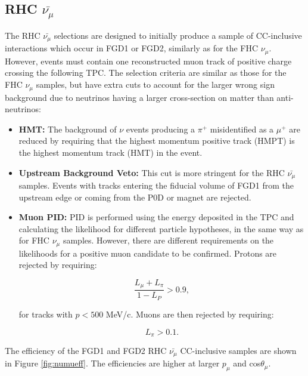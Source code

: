 \subsection{RHC $\bar{\nu_{\mu}}$}

The RHC $\bar{\nu_{\mu}}$ selections are designed to initially produce a sample of CC-inclusive interactions which occur in FGD1 or FGD2, similarly as for the FHC $\nu_{\mu}$. However, events must contain one reconstructed muon track of positive charge crossing the following TPC. The selection criteria are similar as those for the FHC $\nu_{\mu}$ samples, but have extra cuts to account for the larger wrong sign background due to neutrinos having a larger cross-section on matter than anti-neutrinos:

\begin{itemize}

\item \textbf{HMT:} The background of $\nu$ events producing a $\pi^+$ misidentified as a $\mu^+$ are reduced by requiring that the highest momentum positive track (HMPT) is the highest momentum track (HMT) in the event.

\item \textbf{Upstream Background Veto:} This cut is more stringent for the RHC $\bar{\nu_{\mu}}$ samples. Events with tracks entering the fiducial volume of FGD1 from the upstream edge or coming from the P0D or magnet are rejected.

\item \textbf{Muon PID:} PID is performed using the energy deposited in the TPC and calculating the likelihood for different particle hypotheses, in the same way as for FHC $\nu_{\mu}$ samples. However, there are different requirements on the likelihoods for a positive muon candidate to be confirmed. Protons are rejected by requiring:

\begin{equation}
\frac{L_{\mu}+L_{\pi}}{1-L_P} > 0.9,
\end{equation}

for tracks with  $p < 500$ MeV/c. Muons are then rejected by requiring:

\begin{equation}
L_{\pi} > 0.1.
\end{equation}

\end{itemize}

The efficiency of the FGD1 and FGD2 RHC $\bar{\nu_{\mu}}$ CC-inclusive samples are shown in Figure \ref{fig:numueff}.  The efficiencies are higher at larger $p_{\mu}$ and cos$\theta_{\mu}$. 

